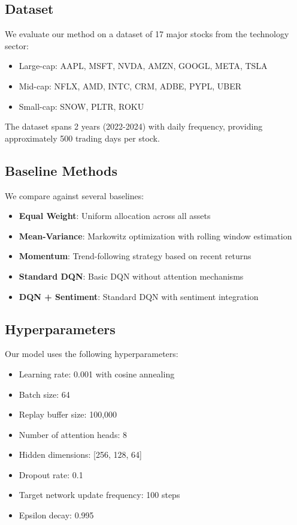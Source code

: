 \documentclass[11pt,twocolumn]{article}
\theoremstyle{definition}
\begin{document}
\subsection{Dataset}

We evaluate our method on a dataset of 17 major stocks from the technology sector:
\begin{itemize}
\item Large-cap: AAPL, MSFT, NVDA, AMZN, GOOGL, META, TSLA
\item Mid-cap: NFLX, AMD, INTC, CRM, ADBE, PYPL, UBER
\item Small-cap: SNOW, PLTR, ROKU
\end{itemize}

The dataset spans 2 years (2022-2024) with daily frequency, providing approximately 500 trading days per stock.

\subsection{Baseline Methods}

We compare against several baselines:

\begin{itemize}
\item \textbf{Equal Weight}: Uniform allocation across all assets
\item \textbf{Mean-Variance}: Markowitz optimization with rolling window estimation
\item \textbf{Momentum}: Trend-following strategy based on recent returns
\item \textbf{Standard DQN}: Basic DQN without attention mechanisms
\item \textbf{DQN + Sentiment}: Standard DQN with sentiment integration
\end{itemize}

\subsection{Hyperparameters}

Our model uses the following hyperparameters:
\begin{itemize}
\item Learning rate: 0.001 with cosine annealing
\item Batch size: 64
\item Replay buffer size: 100,000
\item Number of attention heads: 8
\item Hidden dimensions: [256, 128, 64]
\item Dropout rate: 0.1
\item Target network update frequency: 100 steps
\item Epsilon decay: 0.995
\end{itemize}
\end{document}

